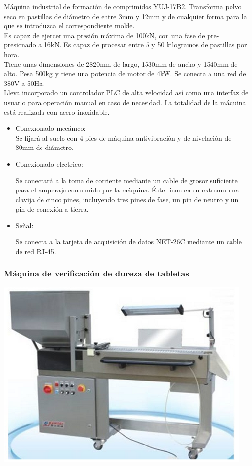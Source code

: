 	Máquina industrial de formación de comprimidos YUJ-17B2. Transforma polvo seco en pastillas de diámetro de entre 3mm y 12mm y de cualquier forma para la que se introduzca el correspondiente molde.\\

	Es capaz de ejercer una presión máxima de 100kN, con una fase de pre-presionado a 16kN. Es capaz de procesar entre 5 y 50 kilogramos de pastillas por hora. \\

	Tiene unas dimensiones de 2820mm de largo, 1530mm de ancho y 1540mm de alto. Pesa 500kg y tiene una potencia de motor de 4kW. Se conecta a una red de 380V a 50Hz.\\

	Lleva incorporado un controlador PLC de alta velocidad así como una interfaz de usuario para operación manual en caso de necesidad. La totalidad de la máquina está realizada con acero inoxidable. 


		\begin{itemize}
				\item{Conexionado mecánico:}\\
				
				Se fijará al suelo con 4 pies de máquina antivibración y de nivelación de 80mm de diámetro.

				\item{Conexionado eléctrico:}

				Se conectará a la toma de corriente mediante un cable de grosor suficiente para el amperaje consumido por la máquina. Éste tiene en su extremo una clavija de cinco pines, incluyendo tres pines de fase, un pin de neutro y un pin de conexión a tierra.  
				
				\item{Señal:}

				Se conecta a la tarjeta de acquisición de datos NET-26C mediante un cable de red RJ-45.
		\end{itemize}

	\newpage

	\subsubsection{Máquina de verificación de dureza de tabletas}

	\includegraphics[scale=0.6]{Datasheets/3Foto.png}
		
